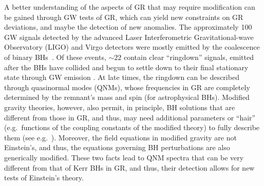 \documentclass[aps,prx,amsmath,floats,floatfix,twocolumn,
  superscriptaddress,nofootinbib,showpacs]{revtex4-1}
\begin{document}
A better understanding of the aspects of GR that may require modification can be gained through GW tests of GR, which can yield new constraints on GR deviations, and maybe the detection of new anomalies. 
The approximately 100 GW signals detected by the advanced Laser Interferometric Gravitational-wave Observatory (LIGO) and Virgo detectors were mostly emitted by the coalescence of binary BHs~\cite{LIGO_01, LIGO_02, LIGO_03, LIGO_04, LIGO_05, LIGO_06, LIGO_07, LIGO_08, LIGO_09, LIGO_10, LIGO_11, LIGO_GW190412, LIGO_GW190814}. 
Of these events, $\sim 22$ contain clear ``ringdown'' signals, emitted after the BHs have collided and begun to settle down to their final stationary state through GW emission \cite{LIGOScientific:2021djp}. 
At late times, the ringdown can be described through quasinormal modes (QNMs), whose frequencies in GR are completely determined by the remnant's mass and spin (for astrophysical BHs). 
Modified gravity theories, however, also permit, in principle, BH solutions that are different from those in GR, and thus, may need additional parameters or ``hair'' (e.g.~functions of the coupling constants of the modified theory) to fully describe them (see e.g.~\cite{Yunes:2009hc,Yunes:2011we}).  
Moreover, the field equations in modified gravity are not Einstein's, and thus, the equations governing BH perturbations are also generically modified. 
These two facts lead to QNM spectra that can be very different from that of Kerr BHs in GR, and thus, their detection allows for new tests of Einstein's theory. 
\end{document}
